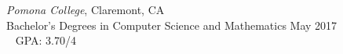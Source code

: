 {\sl Pomona College}, Claremont, CA \\
Bachelor's Degrees in Computer Science and Mathematics \hfill May 2017 \\
\mbox{ } \hfill GPA: 3.70/4\\
